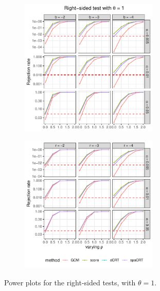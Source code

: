 \documentclass[12pt]{article}
\theoremstyle{definition}
\begin{document}
\begin{figure}
  \centering
  \begin{subfigure}{\textwidth}
    \centering
    \includegraphics[width=0.72\textwidth]{figures-and-tables/simulation/power/plot-bin-NB-normal-B-50000-n-5000-5e3-n5-n5-disp-1-power-fixed-gamma-RIGHT.pdf}
  \end{subfigure}

  \begin{subfigure}{\textwidth}
    \centering
    \includegraphics[width=0.72\textwidth]{figures-and-tables/simulation/power/plot-bin-NB-normal-B-50000-n-5000-5e3-n5-n5-disp-1-power-fixed-beta-RIGHT.pdf}
  \end{subfigure}

  \caption{Power plots for the right-sided tests, with $\theta = 1$.}
  \label{fig:simulation-power-RIGHT-1}
\end{figure}
\end{document}
